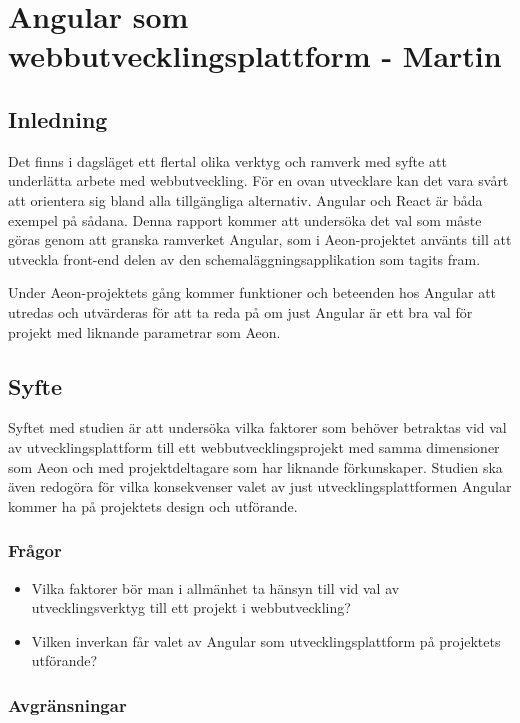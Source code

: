 \chapter{Angular som webbutvecklingsplattform - Martin}

\vspace{1.5em}
\section{Inledning}

Det finns i dagsläget ett flertal olika verktyg och ramverk med syfte att underlätta arbete med webbutveckling. För en ovan utvecklare kan det vara svårt att orientera sig bland alla tillgängliga alternativ. Angular och React är båda exempel på sådana. Denna rapport kommer att undersöka det val som måste göras genom att granska ramverket Angular, som i Aeon-projektet använts till att utveckla front-end delen av den schemaläggningsapplikation som tagits fram.

Under Aeon-projektets gång kommer funktioner och beteenden hos Angular att utredas och utvärderas för att ta reda på om just Angular är ett bra val för projekt med liknande parametrar som Aeon.

\section{Syfte}

Syftet med studien är att undersöka vilka faktorer som behöver betraktas vid val av utvecklingsplattform till ett webbutvecklingsprojekt med samma dimensioner som Aeon och med projektdeltagare som har liknande förkunskaper. Studien ska även redogöra för vilka konsekvenser valet av just utvecklingsplattformen Angular kommer ha på projektets design och utförande.

\subsection{Frågor}
\begin{itemize}
	\item Vilka faktorer bör man i allmänhet ta hänsyn till vid val av utvecklingsverktyg till ett projekt i webbutveckling?
	\item Vilken inverkan får valet av Angular som utvecklingsplattform på projektets utförande? 
\end{itemize}

\subsection{Avgränsningar}

